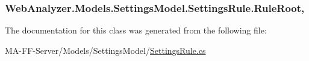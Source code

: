 \subsubsection[{Rule\+Root}]{ Web\+Analyzer.\+Models.\+Settings\+Model.\+Settings\+Rule.\+Rule\+Root\hspace{0.3cm}{\ttfamily [get]}, {\ttfamily [set]}}\label{class_web_analyzer_1_1_models_1_1_settings_model_1_1_settings_rule_a4f1e8ed93d01d4d4bd68a8482286a0f3}


The documentation for this class was generated from the following file\+:\begin{DoxyCompactItemize}
\item 
M\+A-\/\+F\+F-\/\+Server/\+Models/\+Settings\+Model/\hyperlink{_settings_rule_8cs}{Settings\+Rule.\+cs}\end{DoxyCompactItemize}
